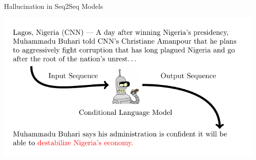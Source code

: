 \begin{frame}{Hallucination in Seq2Seq Models}


\includegraphics{4_fg/image_texs/clm/clm.pdf}


\end{frame}


